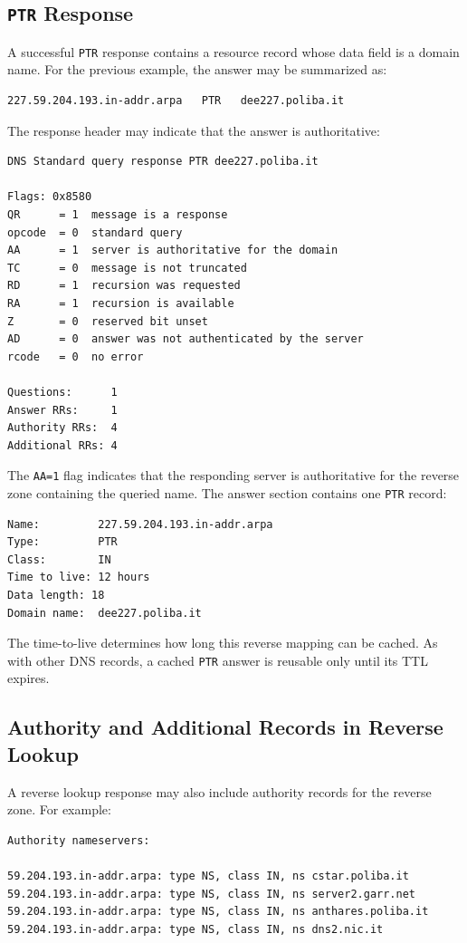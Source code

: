 \documentclass{scrbook}
\begin{document}
	\subsection{\texttt{PTR} Response}
	
	A successful \texttt{PTR} response contains a resource record whose data field is a domain name. For the previous example, the answer may be summarized as:
	\begin{lstlisting}
227.59.204.193.in-addr.arpa   PTR   dee227.poliba.it
	\end{lstlisting}
	
	The response header may indicate that the answer is authoritative:
	\begin{lstlisting}
DNS Standard query response PTR dee227.poliba.it

Flags: 0x8580
QR      = 1  message is a response
opcode  = 0  standard query
AA      = 1  server is authoritative for the domain
TC      = 0  message is not truncated
RD      = 1  recursion was requested
RA      = 1  recursion is available
Z       = 0  reserved bit unset
AD      = 0  answer was not authenticated by the server
rcode   = 0  no error

Questions:      1
Answer RRs:     1
Authority RRs:  4
Additional RRs: 4
	\end{lstlisting}
	
	The \texttt{AA=1} flag indicates that the responding server is authoritative for the reverse zone containing the queried name. The answer section contains one \texttt{PTR} record:
	\begin{lstlisting}
Name:         227.59.204.193.in-addr.arpa
Type:         PTR
Class:        IN
Time to live: 12 hours
Data length: 18
Domain name:  dee227.poliba.it
	\end{lstlisting}
	
	The time-to-live determines how long this reverse mapping can be cached. As with other DNS records, a cached \texttt{PTR} answer is reusable only until its TTL expires.
	
	\newpage
	\subsection{Authority and Additional Records in Reverse Lookup}
	
	A reverse lookup response may also include authority records for the reverse zone. For example:
	\begin{lstlisting}
Authority nameservers:

59.204.193.in-addr.arpa: type NS, class IN, ns cstar.poliba.it
59.204.193.in-addr.arpa: type NS, class IN, ns server2.garr.net
59.204.193.in-addr.arpa: type NS, class IN, ns anthares.poliba.it
59.204.193.in-addr.arpa: type NS, class IN, ns dns2.nic.it
	\end{lstlisting}
	
\end{document}
